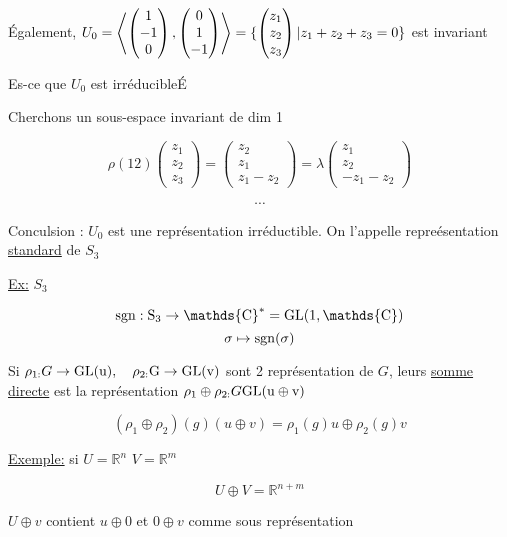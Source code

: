 Également, $U_0 = \expval{\begin{pmatrix} 1 \\ -1 \\ 0 \end{pmatrix} , \begin{pmatrix} 0 \\ 1 \\ -1 \end{pmatrix}   } =  \{ \begin{pmatrix} z_1 \\ z_2 \\ z_3 \end{pmatrix} | z_1 + z_2 +z_3 = 0 \} $ est invariant


Es-ce que $U_0$ est irréducibleÉ

Cherchons un sous-espace invariant de dim 1

\[ \rho (12) \begin{pmatrix} z_1 \\ z_2 \\ z_3 \end{pmatrix}  = \begin{pmatrix} z_2 \\ z_1 \\ z_1 - z_2 \end{pmatrix} = \lambda  \begin{pmatrix} z_1 \\ z_2 \\ -z_1 - z_2 \end{pmatrix}   \]

\[ \dotsb \]

Conculsion : $U_0$ est une représentation irréductible. On l'appelle repreésentation \underline{standard} de $S_3$

\underline{Ex:} $S_3$


\[ \rm{sgn}: S_3 \to \mathds{C}^{*} = \rm{GL}(1, \mathds{C}) \]
\[ \sigma \mapsto \rm{sgn}(\sigma) \]

Si $\rho_{1:} G \to \rm{GL}(u), \quad \rho_{2:} G \to \rm{GL}(v)$ sont 2 représentation de $G$, leurs \underline{somme directe} est la représentation $\rho_1 \oplus \rho_{2:} G \rm{GL}(u \oplus v)$ 

\[ (\rho_1 \oplus \rho _2 )(g) (u \oplus v) = \rho_1 (g) u \oplus \rho_2 (g) v \]


\underline{Exemple:} si $U = \mathds{R}^{n}$ $V = \mathds{R}^{m}$ 

\[ U \oplus V  = \mathds{R}^{n+m}\]

$U \oplus v$ contient $u \oplus 0$ et $0 \oplus v$ comme sous représentation 



